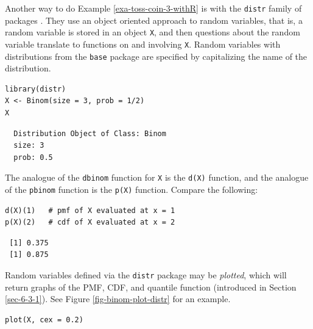 \documentclass[captions=tableheading]{scrbook}
\begin{document}
\begin{example}
Another way to do Example \ref{exa-toss-coin-3-withR} is with the \texttt{distr} family of packages \cite{Ruckdescheldistr}. They use an object oriented approach to random variables, that is, a random variable is stored in an object \texttt{X}, and then questions about the random variable translate to functions on and involving \texttt{X}. Random variables with distributions from the \texttt{base} package are specified by capitalizing the name of the distribution.


\begin{verbatim}
library(distr)
X <- Binom(size = 3, prob = 1/2)
X
\end{verbatim}

\begin{verbatim}
  Distribution Object of Class: Binom
  size: 3
  prob: 0.5
\end{verbatim}

The analogue of the \texttt{dbinom} function for \texttt{X} is the \texttt{d(X)} function, and the analogue of the \texttt{pbinom} function is the \texttt{p(X)} function. Compare the following:


\begin{verbatim}
d(X)(1)   # pmf of X evaluated at x = 1
p(X)(2)   # cdf of X evaluated at x = 2
\end{verbatim}

\begin{verbatim}
 [1] 0.375
 [1] 0.875
\end{verbatim}

\end{example}

Random variables defined via the \texttt{distr} package may be \emph{plotted}, which will return graphs of the PMF, CDF, and quantile function (introduced in Section \ref{sec-6-3-1}). See Figure \ref{fig-binom-plot-distr} for an example.


\begin{verbatim}
plot(X, cex = 0.2)
\end{verbatim}
\end{document}
